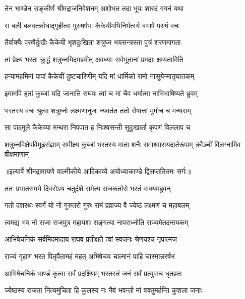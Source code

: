 \twolineshloka
{तेन भाण्डेन सङ्कीर्णं श्रीमद्राजनिवेशनम्}
{अशोभत तदा भूयः शारदं गगनं यथा} %

\twolineshloka
{स बली बलवत्क्रोधाद्गृहीत्वा पुरुषर्षभः}
{कैकेयीमभिनिर्भर्त्स्य बभाषे परुषं वचः} %

\twolineshloka
{तैर्वाक्यैः परुषैर्दुःखैः कैकेयी भृशदुःखिता}
{शत्रुघ्न भयसन्त्रस्ता पुत्रं शरणमागता} %

\twolineshloka
{तां प्रेक्ष्य भरतः क्रुद्धं शत्रुघ्नमिदमब्रवीत्}
{अवध्याः सर्वभूतानां प्रमदाः क्षम्यतामिति} %

\twolineshloka
{हन्यामहमिमां पापां कैकेयीं दुष्टचारिणीम्}
{यदि मां धार्मिको रामो नासूयेन्मातृघातकम्} %

\twolineshloka
{इमामपि हतां कुब्जां यदि जानाति राघवः}
{त्वां च मां चैव धर्मात्मा नाभिभाषिष्यते ध्रुवम्} %

\twolineshloka
{भरतस्य वचः श्रुत्वा शत्रुघ्नो लक्ष्मणानुजः}
{न्यवर्तत ततो रोषात्तां मुमोच च मन्थराम्} %

\twolineshloka
{सा पादमूले कैकेय्या मन्थरा निपपात ह}
{निःश्वसन्ती सुदुःखार्ता कृपणं विललाप च} %

\fourlineindentedshloka
{शत्रुघ्नविक्षेपविमूढसंज्ञाम्}
{समीक्ष्य कुब्जां भरतस्य माता}
{शनैः समाश्वासयदार्तरूपाम्}
{क्रौञ्चीं विलग्नामिव वीक्षमाणाम्} %


{॥इत्यार्षे श्रीमद्रामायणे वाल्मीकीये आदिकाव्ये अयोध्याकाण्डे द्विसप्ततितमः सर्गः॥}


\twolineshloka
{ततः प्रभातसमये दिवसेऽथ चतुर्दशे}
{समेत्य राजकर्तारो भरतं वाक्यमब्रुवन्} %

\twolineshloka
{गतो दशरथः स्वर्गं यो नो गुरुतरो गुरुः}
{रामं प्रव्राज्य वै ज्येष्ठं लक्ष्मणं च महाबलम्} %

\twolineshloka
{त्वमद्य भव नो राजा राजपुत्र महायशः}
{सङ्गत्या नापराध्नोति राज्यमेतदनायकम्} %

\twolineshloka
{आभिषेचनिकं सर्वमिदमादाय राघव}
{प्रतीक्षते त्वां स्वजनः श्रेणयश्च नृपात्मज} %

\twolineshloka
{राज्यं गृहाण भरत पितृपैतामहं महत्}
{अभिषेचय चात्मानं पाहि चास्मान्नरर्षभ} %

\twolineshloka
{आभिषेचनिकं भाण्डं कृत्वा सर्वं प्रदक्षिणम्}
{भरतस्तं जनं सर्वं प्रत्युवाच धृतव्रतः} %

\twolineshloka
{ज्येष्ठस्य राजता नित्यमुचिता हि कुलस्य नः}
{नैवं भवन्तो मां वक्तुमर्हन्ति कुशला जनाः} %

